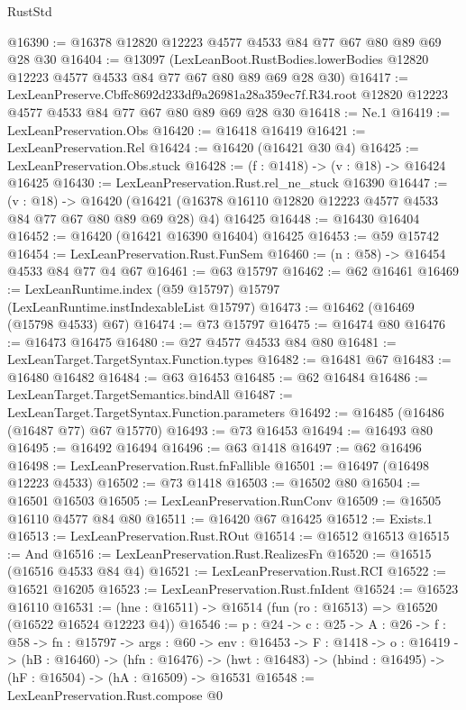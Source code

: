 \begin{lexlean}{RustStd}
\begin{coremodule}
@16390 := @16378 @12820 @12223 @4577 @4533 @84 @77 @67 @80 @89 @69 @28 @30
@16404 := @13097
    (LexLeanBoot.RustBodies.lowerBodies @12820 @12223 @4577 @4533 @84 @77 @67 @80 @89 @69 @28 @30)
@16417 := LexLeanPreserve.Cbffc8692d233df9a26981a28a359ec7f.R34.root
    @12820
    @12223
    @4577
    @4533
    @84
    @77
    @67
    @80
    @89
    @69
    @28
    @30
@16418 := Ne.{1}
@16419 := LexLeanPreservation.Obs
@16420 := @16418 @16419
@16421 := LexLeanPreservation.Rel
@16424 := @16420 (@16421 @30 @4)
@16425 := LexLeanPreservation.Obs.stuck
@16428 := (f : @1418) -> (v : @18) -> @16424 @16425
@16430 := LexLeanPreservation.Rust.rel_ne_stuck @16390
@16447 := (v : @18) ->
  @16420 (@16421 (@16378 @16110 @12820 @12223 @4577 @4533 @84 @77 @67 @80 @89 @69 @28) @4) @16425
@16448 := @16430 @16404
@16452 := @16420 (@16421 @16390 @16404) @16425
@16453 := @59 @15742
@16454 := LexLeanPreservation.Rust.FunSem
@16460 := (n : @58) -> @16454 @4533 @84 @77 @4 @67
@16461 := @63 @15797
@16462 := @62 @16461
@16469 := LexLeanRuntime.index (@59 @15797) @15797 (LexLeanRuntime.instIndexableList @15797)
@16473 := @16462 (@16469 (@15798 @4533) @67)
@16474 := @73 @15797
@16475 := @16474 @80
@16476 := @16473 @16475
@16480 := @27 @4577 @4533 @84 @80
@16481 := LexLeanTarget.TargetSyntax.Function.types
@16482 := @16481 @67
@16483 := @16480 @16482
@16484 := @63 @16453
@16485 := @62 @16484
@16486 := LexLeanTarget.TargetSemantics.bindAll
@16487 := LexLeanTarget.TargetSyntax.Function.parameters
@16492 := @16485 (@16486 (@16487 @77) @67 @15770)
@16493 := @73 @16453
@16494 := @16493 @80
@16495 := @16492 @16494
@16496 := @63 @1418
@16497 := @62 @16496
@16498 := LexLeanPreservation.Rust.fnFallible
@16501 := @16497 (@16498 @12223 @4533)
@16502 := @73 @1418
@16503 := @16502 @80
@16504 := @16501 @16503
@16505 := LexLeanPreservation.RunConv
@16509 := @16505 @16110 @4577 @84 @80
@16511 := @16420 @67 @16425
@16512 := Exists.{1}
@16513 := LexLeanPreservation.Rust.ROut
@16514 := @16512 @16513
@16515 := And
@16516 := LexLeanPreservation.Rust.RealizesFn
@16520 := @16515 (@16516 @4533 @84 @4)
@16521 := LexLeanPreservation.Rust.RCI
@16522 := @16521 @16205
@16523 := LexLeanPreservation.Rust.fnIdent
@16524 := @16523 @16110
@16531 := (hne : @16511) -> @16514 (fun (ro : @16513) => @16520 (@16522 @16524 @12223 @4))
@16546 := {p : @24} ->
  {c : @25} ->
  {A : @26} ->
  {f : @58} ->
  {fn : @15797} ->
  {args : @60} ->
  {env : @16453} ->
  {F : @1418} ->
  {o : @16419} ->
  (hB : @16460) ->
  (hfn : @16476) -> (hwt : @16483) -> (hbind : @16495) -> (hF : @16504) -> (hA : @16509) -> @16531
@16548 := LexLeanPreservation.Rust.compose @0

\end{coremodule}
\end{lexlean}
